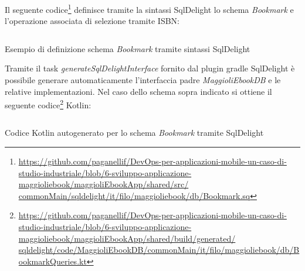 Il seguente codice\footnote{\href{https://github.com/paganellif/DevOps-per-applicazioni-mobile-un-caso-di-studio-industriale/blob/6-sviluppo-applicazione-maggioliebook/maggioliEbookApp/shared/src/commonMain/sqldelight/it/filo/maggioliebook/db/Bookmark.sq}{https://github.com/paganellif/DevOps-per-applicazioni-mobile-un-caso-di-studio-industriale/blob/6-sviluppo-applicazione-maggioliebook/maggioliEbookApp/shared/src/\\commonMain/sqldelight/it/filo/maggioliebook/db/Bookmark.sq}} definisce tramite la sintassi SqlDelight lo schema \textit{Bookmark} e l'operazione associata di selezione tramite ISBN:

\begin{listing}[H]
    \inputminted{sql}{code/bookmark-sqldelight.sq}
    \caption{Esempio di definizione schema \textit{Bookmark} tramite sintassi SqlDelight}
\end{listing}

Tramite il task \textit{generateSqlDelightInterface} fornito dal plugin gradle SqlDelight è possibile generare automaticamente l'interfaccia padre \textit{MaggioliEbookDB} e le relative implementazioni. Nel caso dello schema sopra indicato si ottiene il seguente codice\footnote{\href{https://github.com/paganellif/DevOps-per-applicazioni-mobile-un-caso-di-studio-industriale/blob/6-sviluppo-applicazione-maggioliebook/maggioliEbookApp/shared/build/generated/sqldelight/code/MaggioliEbookDB/commonMain/it/filo/maggioliebook/db/BookmarkQueries.kt}{https://github.com/paganellif/DevOps-per-applicazioni-mobile-un-caso-di-studio-industriale/blob/6-sviluppo-applicazione-maggioliebook/maggioliEbookApp/shared/build/generated/\\sqldelight/code/MaggioliEbookDB/commonMain/it/filo/maggioliebook/db/BookmarkQueries.kt}} Kotlin:

\begin{listing}[H]
    \inputminted{kotlin}{code/bookmark-sqldelight.kt}
    \caption{Codice Kotlin autogenerato per lo schema \textit{Bookmark} tramite SqlDelight}
\end{listing}

